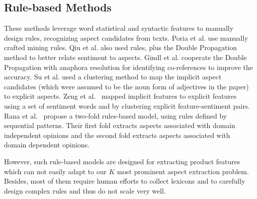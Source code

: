 \documentclass[11pt,a4paper]{article}
\begin{document}
\subsection{Rule-based Methods}
These methods leverage word statistical and 
syntactic features to manually design rules, recognizing aspect candidates 
from texts.
Poria et al.  use manually crafted mining rules. 
Qiu et al.  also used rules, plus the 
Double Propagation method to better relate sentiment to aspects. 
Gindl et al.  cooperate the Double Propagation 
with anaphora resolution for identifying 
co-references to improve the accuracy. 
Su et al.  used a clustering method to map 
the implicit aspect candidates (which were assumed to be the noun form 
of adjectives in the paper) to explicit aspects. 
Zeng et al.~ mapped implicit features 
to explicit features using a set of sentiment words and by clustering 
explicit feature-sentiment pairs.
Rana et al.~ propose a two-fold rules-based model, 
using rules defined by sequential patterns. Their first fold extracts aspects 
associated with domain independent opinions and the 
second fold extracts aspects 
associated with domain dependent opinions. 

However, such rule-based models are designed for extracting product 
features which can not easily adapt to our $K$ most prominent 
aspect extraction problem. Besides, most of them require human efforts 
to collect lexicons and to carefully design complex rules and 
thus do not scale very well. 
\end{document}
